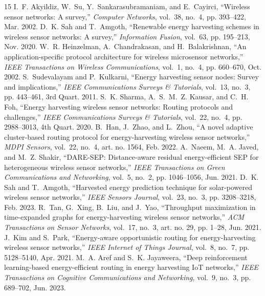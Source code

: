 \documentclass[journal]{IEEEtran}
\begin{document}

\begin{thebibliography}{15}
I.~F. Akyildiz, W.~Su, Y.~Sankarasubramaniam, and E.~Cayirci, ``Wireless sensor networks: A survey,'' \textit{Computer Networks}, vol.~38, no.~4, pp. 393--422, Mar. 2002.
D.~K. Sah and T.~Amgoth, ``Renewable energy harvesting schemes in wireless sensor networks: A survey,'' \textit{Information Fusion}, vol.~63, pp. 195--213, Nov. 2020.
W.~R. Heinzelman, A.~Chandrakasan, and H.~Balakrishnan, ``An application-specific protocol architecture for wireless microsensor networks,'' \textit{IEEE Transactions on Wireless Communications}, vol.~1, no.~4, pp. 660--670, Oct. 2002.
S.~Sudevalayam and P.~Kulkarni, ``Energy harvesting sensor nodes: Survey and implications,'' \textit{IEEE Communications Surveys \& Tutorials}, vol.~13, no.~3, pp. 443--461, 3rd Quart. 2011.
S.~K. Sharma, A.~S.~M.~Z. Kausar, and C.~H. Foh, ``Energy harvesting wireless sensor networks: Routing protocols and challenges,'' \textit{IEEE Communications Surveys \& Tutorials}, vol.~22, no.~4, pp. 2988--3013, 4th Quart. 2020.
B.~Han, J.~Zhao, and L.~Zhou, ``A novel adaptive cluster-based routing protocol for energy-harvesting wireless sensor networks,'' \textit{MDPI Sensors}, vol.~22, no.~4, art. no. 1564, Feb. 2022.
A.~Naeem, M.~A. Javed, and M.~Z. Shakir, ``DARE-SEP: Distance-aware residual energy-efficient SEP for heterogeneous wireless sensor networks,'' \textit{IEEE Transactions on Green Communications and Networking}, vol.~5, no.~2, pp. 1046--1056, Jun. 2021.
D.~K. Sah and T.~Amgoth, ``Harvested energy prediction technique for solar-powered wireless sensor networks,'' \textit{IEEE Sensors Journal}, vol.~23, no.~3, pp. 3208--3218, Feb. 2023.
R.~Tan, G.~Xing, B.~Liu, and J.~Yao, ``Throughput maximization in time-expanded graphs for energy-harvesting wireless sensor networks,'' \textit{ACM Transactions on Sensor Networks}, vol.~17, no.~3, art. no. 29, pp. 1--28, Jun. 2021.
J.~Kim and S.~Park, ``Energy-aware opportunistic routing for energy-harvesting wireless sensor networks,'' \textit{IEEE Internet of Things Journal}, vol.~8, no.~7, pp. 5128--5140, Apr. 2021.
M.~A. Aref and S.~K. Jayaweera, ``Deep reinforcement learning-based energy-efficient routing in energy harvesting IoT networks,'' \textit{IEEE Transactions on Cognitive Communications and Networking}, vol.~9, no.~3, pp. 689--702, Jun. 2023.

\end{thebibliography}
\end{document}
